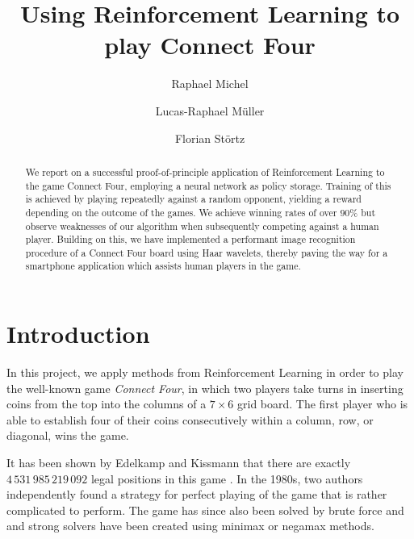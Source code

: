 \documentclass[10pt,twocolumn,letterpaper]{article}
\begin{document}
\title{Using Reinforcement Learning to play Connect Four}

\author{Raphael Michel
\and
Lucas-Raphael Müller
\and
Florian Störtz
}

\maketitle

\begin{abstract}
   We report on a successful proof-of-principle application of Reinforcement Learning to the game Connect Four, employing a neural network as policy storage. Training of this is achieved by playing repeatedly against a random opponent, yielding a reward depending on the outcome of the games. We achieve winning rates of over $90\%$ but observe weaknesses of our algorithm when subsequently competing against a human player. Building on this, we have implemented a performant image recognition procedure of a Connect Four board using Haar wavelets, thereby paving the way for a smartphone application which assists human players in the game.
\end{abstract}

\section{Introduction}

In this project, we apply methods from Reinforcement Learning in order to play
the well-known game \emph{Connect Four}, in which two players take turns in
inserting coins from the top into the columns of a $7\times 6$ grid board.
The first player who is able to establish four of their coins consecutively
within a column, row, or diagonal, wins the game.

It has been shown by Edelkamp and Kissmann that there are exactly $4\,531\,985\,219\,092$ legal positions in this game \cite{Edelkamp2008}. In the 1980s, two authors independently found a strategy for perfect playing of the game \cite{Allis88, Allen1990} that is rather complicated to perform. The game has since also been solved by brute force and and strong solvers have been created using minimax or negamax methods.
\end{document}
